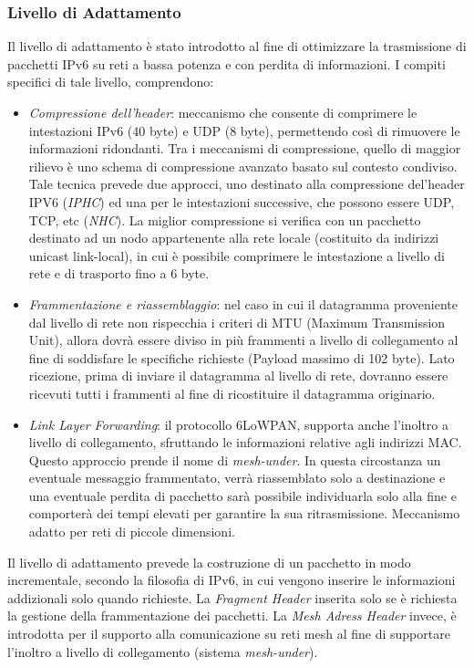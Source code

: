 \subsubsection{Livello di Adattamento}
Il livello di adattamento è stato introdotto al fine di ottimizzare la trasmissione di pacchetti IPv6 su reti a bassa potenza e con perdita di informazioni. I compiti specifici di tale livello, comprendono:
\begin{itemize}
    \item \textit{Compressione dell'header}: meccanismo che consente di comprimere le intestazioni IPv6 (40 byte) e UDP (8 byte), permettendo così di rimuovere le informazioni ridondanti. Tra i meccanismi di compressione, quello di maggior rilievo è uno schema di compressione avanzato basato sul contesto condiviso. Tale tecnica prevede due approcci, uno destinato alla compressione del'header IPV6 (\textit{IPHC}) ed una per le intestazioni successive, che possono essere UDP, TCP, etc (\textit{NHC}). La miglior compressione si verifica con un pacchetto destinato ad un nodo appartenente alla rete locale (costituito da indirizzi unicast link-local), in cui è possibile comprimere le intestazione a livello di rete e di trasporto fino a 6 byte.
    
    \item \textit{Frammentazione e riassemblaggio}: nel caso in cui il datagramma proveniente dal livello di rete non rispecchia i criteri di MTU (Maximum Transmission Unit), allora dovrà essere diviso in più frammenti a livello di collegamento al fine di soddisfare le specifiche richieste (Payload massimo di 102 byte). Lato ricezione, prima di inviare il datagramma al livello di rete, dovranno essere ricevuti tutti i frammenti al fine di ricostituire il datagramma originario.
    
    \item \textit{Link Layer Forwarding}: il protocollo 6LoWPAN, supporta anche l'inoltro a livello di collegamento, sfruttando le informazioni relative agli indirizzi MAC. Questo approccio prende il nome di \textit{mesh-under}. In questa circostanza un eventuale messaggio frammentato, verrà riassemblato solo a destinazione e una eventuale perdita di pacchetto sarà possibile individuarla solo alla fine e comporterà dei tempi elevati per garantire la sua ritrasmissione. Meccanismo adatto per reti di piccole dimensioni.
\end{itemize}

\noindent Il livello di adattamento prevede la costruzione di un pacchetto in modo incrementale, secondo la filosofia di IPv6, in cui vengono inserire le informazioni addizionali solo quando richieste. La \textit{Fragment Header} inserita solo se è richiesta la gestione della frammentazione dei pacchetti. La \textit{Mesh Adress Header} invece, è introdotta per il supporto alla comunicazione su reti mesh al fine di supportare l'inoltro a livello di collegamento (sistema \textit{mesh-under}).

